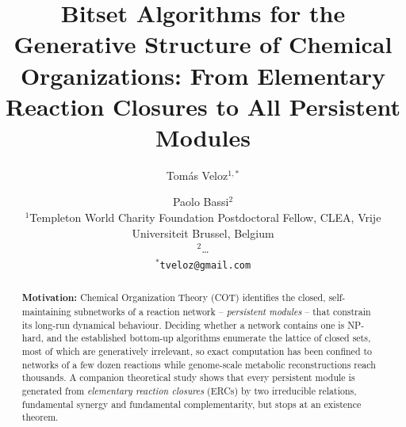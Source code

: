 \documentclass[11pt]{article}
\theoremstyle{plain}
\theoremstyle{remark}
\begin{document}
\title{Bitset Algorithms for the Generative Structure of Chemical
Organizations: From Elementary Reaction Closures to All Persistent Modules}

\author{%
  Tom\'as Veloz$^{1,\ast}$ \and Paolo Bassi$^{2}$\\[4pt]
  \small $^{1}$Templeton World Charity Foundation Postdoctoral Fellow,
  CLEA, Vrije Universiteit Brussel, Belgium\\
  \small $^{2}$\ldots\\
  \small $^{\ast}$\texttt{tveloz@gmail.com}
}
\date{}

\maketitle

\begin{abstract}
\noindent\textbf{Motivation:} Chemical Organization Theory (COT) identifies
the closed, self-maintaining subnetworks of a reaction network --
\emph{persistent modules} -- that constrain its long-run dynamical
behaviour. Deciding whether a network contains one is NP-hard, and the
established bottom-up algorithms enumerate the lattice of closed sets,
most of which are generatively irrelevant, so exact computation has been
confined to networks of a few dozen reactions while genome-scale metabolic
reconstructions reach thousands. A companion theoretical study shows that
every persistent module is generated from \emph{elementary reaction
closures} (ERCs) by two irreducible relations, fundamental synergy and
fundamental complementarity, but stops at an existence theorem.


\end{abstract}
\end{document}
